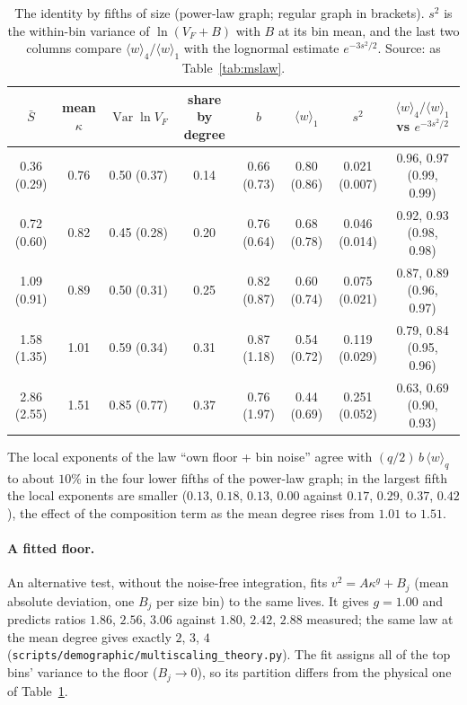 \documentclass[pre,onecolumn,superscriptaddress,nofootinbib]{revtex4-2}
\newcommand{\Var}{\operatorname{Var}}
\newcommand{\Sb}{\bar S}
\begin{document}
\begin{table}[h]
\caption{The identity by fifths of size (power-law graph; regular graph in brackets).  $s^2$ is the
within-bin variance of $\ln(V_F+B)$ with $B$ at its bin mean, and the last two columns compare
$\langle w\rangle_4/\langle w\rangle_1$ with the lognormal estimate $e^{-3s^2/2}$.  Source: as Table~\ref{tab:mslaw}.}
\label{tab:fifths}
\begin{ruledtabular}
\begin{tabular}{cccccccc}
$\Sb$ & mean $\kappa$ & $\Var\ln V_F$ & share by degree & $b$ & $\langle w\rangle_1$ & $s^2$ & $\langle w\rangle_4/\langle w\rangle_1$ vs $e^{-3s^2/2}$\\
\hline
0.36 (0.29) & 0.76 & 0.50 (0.37) & 0.14 & 0.66 (0.73) & 0.80 (0.86) & 0.021 (0.007) & 0.96, 0.97 (0.99, 0.99)\\
0.72 (0.60) & 0.82 & 0.45 (0.28) & 0.20 & 0.76 (0.64) & 0.68 (0.78) & 0.046 (0.014) & 0.92, 0.93 (0.98, 0.98)\\
1.09 (0.91) & 0.89 & 0.50 (0.31) & 0.25 & 0.82 (0.87) & 0.60 (0.74) & 0.075 (0.021) & 0.87, 0.89 (0.96, 0.97)\\
1.58 (1.35) & 1.01 & 0.59 (0.34) & 0.31 & 0.87 (1.18) & 0.54 (0.72) & 0.119 (0.029) & 0.79, 0.84 (0.95, 0.96)\\
2.86 (2.55) & 1.51 & 0.85 (0.77) & 0.37 & 0.76 (1.97) & 0.44 (0.69) & 0.251 (0.052) & 0.63, 0.69 (0.90, 0.93)\\
\end{tabular}
\end{ruledtabular}
\end{table}

The local exponents of the law ``own floor + bin noise'' agree with $(q/2)\,b\,\langle w\rangle_q$ to about $10\%$
in the four lower fifths of the power-law graph; in the largest fifth the local exponents are smaller
($0.13$, $0.18$, $0.13$, $0.00$ against $0.17$, $0.29$, $0.37$, $0.42$), the effect of the composition term as
the mean degree rises from $1.01$ to $1.51$.

\paragraph{A fitted floor.}  An alternative test, without the noise-free integration, fits
$v^2=A\kappa^g+B_j$ (mean absolute deviation, one $B_j$ per size bin) to the same lives.  It gives
$g=1.00$ and predicts ratios $1.86$, $2.56$, $3.06$ against $1.80$, $2.42$, $2.88$ measured; the same law at
the mean degree gives exactly $2$, $3$, $4$ (\texttt{scripts/demographic/multiscaling\_theory.py}).  The
fit assigns all of the top bins' variance to the floor ($B_j\to0$), so its partition differs from the
physical one of Table~\ref{tab:fifths}.
\end{document}
